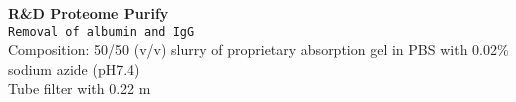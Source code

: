 \textbf{R&D Proteome Purify} 
\\
\texttt{Removal of albumin and IgG}
\\
Composition: 
50/50 (v/v) slurry of proprietary absorption gel in PBS with 0.02\% sodium azide (pH7.4) \\
Tube filter with 0.22 \mu m
